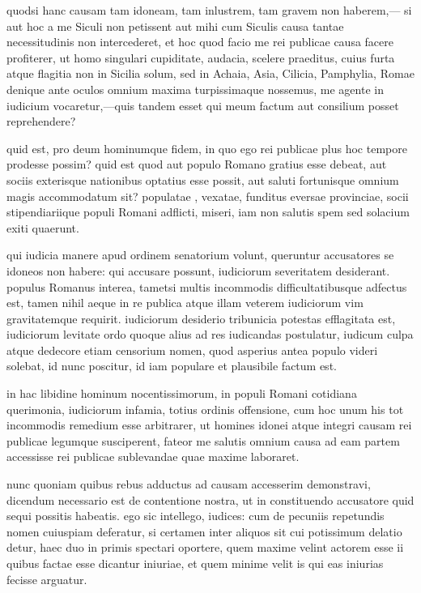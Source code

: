  quodsi hanc causam tam idoneam, tam inlustrem, tam gravem non haberem,— si aut hoc a me Siculi non petissent aut mihi cum Siculis causa tantae necessitudinis non intercederet, et hoc quod facio me rei publicae causa facere profiterer, ut homo singulari cupiditate, audacia, scelere praeditus, cuius furta atque flagitia non in Sicilia solum, sed in Achaia, Asia, Cilicia, Pamphylia, Romae denique ante oculos omnium maxima turpissimaque nossemus, me agente in iudicium vocaretur,—quis tandem esset qui meum factum aut consilium posset reprehendere?

 quid est, pro deum hominumque fidem, in quo ego rei publicae plus hoc tempore prodesse possim? quid est quod aut populo Romano gratius esse debeat, aut sociis exterisque nationibus optatius esse possit, aut saluti fortunisque omnium magis accommodatum sit? populatae , vexatae, funditus eversae provinciae, socii stipendiariique populi Romani adflicti, miseri, iam non salutis spem sed solacium exiti quaerunt.

 qui iudicia manere apud ordinem senatorium volunt, queruntur accusatores se idoneos non habere: qui accusare possunt, iudiciorum severitatem desiderant. populus Romanus interea, tametsi multis incommodis difficultatibusque adfectus est, tamen nihil aeque in re publica atque illam veterem iudiciorum vim gravitatemque requirit. iudiciorum desiderio tribunicia potestas efflagitata est, iudiciorum levitate ordo quoque alius ad res iudicandas postulatur, iudicum culpa atque dedecore etiam censorium nomen, quod asperius antea populo videri solebat, id nunc poscitur, id iam populare et plausibile factum est.

 in hac libidine hominum nocentissimorum, in populi Romani cotidiana querimonia, iudiciorum infamia, totius ordinis offensione, cum hoc unum his tot incommodis remedium esse arbitrarer, ut homines idonei atque integri causam rei publicae legumque susciperent, fateor me salutis omnium causa ad eam partem accessisse rei publicae sublevandae quae maxime laboraret.

 nunc quoniam quibus rebus adductus ad causam accesserim demonstravi, dicendum necessario est de contentione nostra, ut in constituendo accusatore quid sequi possitis habeatis. ego sic intellego, iudices: cum de pecuniis repetundis nomen cuiuspiam deferatur, si certamen inter aliquos sit cui potissimum delatio detur, haec duo in primis spectari oportere, quem maxime velint actorem esse ii quibus factae esse dicantur iniuriae, et quem minime velit is qui eas iniurias fecisse arguatur.

